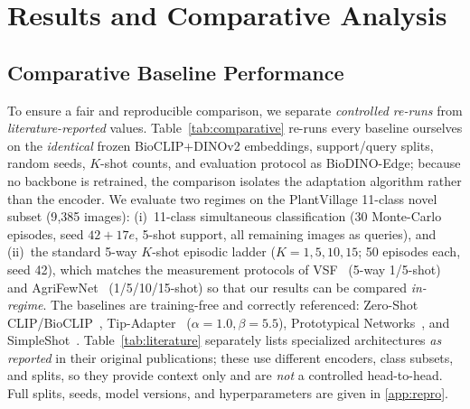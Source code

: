 \documentclass[preprint,12pt]{elsarticle}
\begin{document}
\section{Results and Comparative Analysis}
\label{sec:results}

\subsection{Comparative Baseline Performance}
\label{sec:comparative_results}
To ensure a fair and reproducible comparison, we separate \emph{controlled re-runs} from \emph{literature-reported} values. Table~\ref{tab:comparative} re-runs every baseline ourselves on the \emph{identical} frozen BioCLIP+DINOv2 embeddings, support/query splits, random seeds, $K$-shot counts, and evaluation protocol as BioDINO-Edge; because no backbone is retrained, the comparison isolates the adaptation algorithm rather than the encoder. We evaluate two regimes on the PlantVillage 11-class novel subset (9{,}385 images): (i)~11-class simultaneous classification (30 Monte-Carlo episodes, seed $42+17e$, 5-shot support, all remaining images as queries), and (ii)~the standard 5-way $K$-shot episodic ladder ($K=1,5,10,15$; 50 episodes each, seed 42), which matches the measurement protocols of VSF~\cite{zhou2026vsf} (5-way 1/5-shot) and AgriFewNet~\cite{babu2025agrifewnet} (1/5/10/15-shot) so that our results can be compared \emph{in-regime}. The baselines are training-free and correctly referenced: Zero-Shot CLIP/BioCLIP~\cite{radford2021clip,stevens2024bioclip}, Tip-Adapter~\cite{zhang2022tip} ($\alpha{=}1.0,\beta{=}5.5$), Prototypical Networks~\cite{snell2017prototypical}, and SimpleShot~\cite{wang2019simpleshot}. Table~\ref{tab:literature} separately lists specialized architectures \emph{as reported} in their original publications; these use different encoders, class subsets, and splits, so they provide context only and are \emph{not} a controlled head-to-head. Full splits, seeds, model versions, and hyperparameters are given in \ref{app:repro}.
\end{document}
